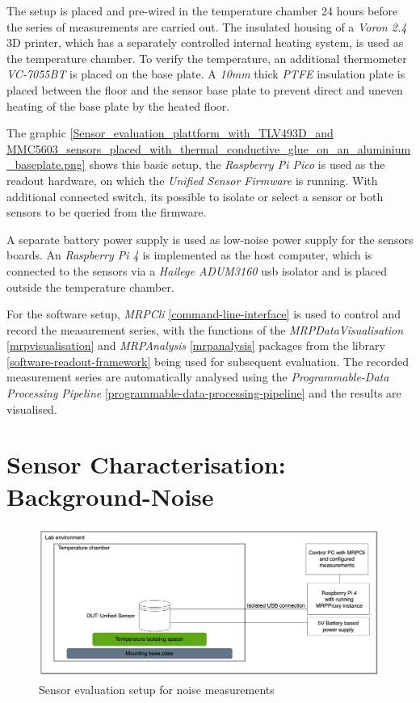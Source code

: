 The setup is placed and pre-wired in the temperature chamber 24 hours
before the series of measurements are carried out. The insulated housing
of a \emph{Voron 2.4} 3D printer, which has a separately controlled
internal heating system, is used as the temperature chamber. To verify
the temperature, an additional thermometer \emph{VC-7055BT} is placed on
the base plate. A \emph{10mm} thick \emph{PTFE} insulation plate is
placed between the floor and the sensor base plate to prevent direct and
uneven heating of the base plate by the heated floor.

The graphic
\ref{Sensor_evaluation_plattform_with_TLV493D_and MMC5603_sensors_placed_with_thermal_conductive_glue_on_an_aluminium_baseplate.png}
shows this basic setup, the \emph{Raspberry Pi Pico} is used as the
readout hardware, on which the \emph{Unified Sensor Firmware} is
running. With additional connected switch, its possible to isolate or
select a sensor or both sensors to be queried from the firmware.

A separate battery power supply is used as low-noise power supply for
the sensors boards. An \emph{Raspberry Pi 4} is implemented as the host
computer, which is connected to the sensors via a \emph{Hailege
ADUM3160} \gls{usb} isolator and is placed outside the temperature
chamber.

For the software setup, \emph{MRPCli} \ref{command-line-interface} is
used to control and record the measurement series, with the functions of
the \emph{MRPDataVisualisation} \ref{mrpvisualisation} and
\emph{MRPAnalysis} \ref{mrpanalysis} packages from the library
\ref{software-readout-framework} being used for subsequent evaluation.
The recorded measurement series are automatically analysed using the
\emph{Programmable-Data Processing Pipeline}
\ref{programmable-data-processing-pipeline} and the results are
visualised.

\hypertarget{sensor-characterisation-background-noise}{%
\section{Sensor Characterisation:
Background-Noise}\label{sensor-characterisation-background-noise}}

\begin{figure}
\centering
\includegraphics{./generated_images/border_Sensor_evaluation_setup_for_noise_measurements.png}
\caption{Sensor evaluation setup for noise measurements
\label{Sensor_evaluation_setup_for_noise_measurements.png}}
\end{figure}

